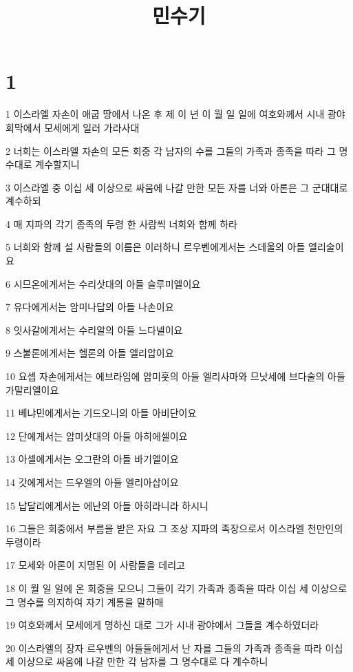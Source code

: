 

\title{민수기}


\chapter{1}

\par 1 이스라엘 자손이 애굽 땅에서 나온 후 제 이 년 이 월 일 일에 여호와께서 시내 광야 회막에서 모세에게 일러 가라사대
\par 2 너희는 이스라엘 자손의 모든 회중 각 남자의 수를 그들의 가족과 종족을 따라 그 명수대로 계수할지니
\par 3 이스라엘 중 이십 세 이상으로 싸움에 나갈 만한 모든 자를 너와 아론은 그 군대대로 계수하되
\par 4 매 지파의 각기 종족의 두령 한 사람씩 너희와 함께 하라
\par 5 너희와 함께 설 사람들의 이름은 이러하니 르우벤에게서는 스데울의 아들 엘리술이요
\par 6 시므온에게서는 수리삿대의 아들 슬루미엘이요
\par 7 유다에게서는 암미나답의 아들 나손이요
\par 8 잇사갈에게서는 수리알의 아들 느다넬이요
\par 9 스불론에게서는 헬론의 아들 엘리압이요
\par 10 요셉 자손에게서는 에브라임에 암미훗의 아들 엘리사마와 므낫세에 브다술의 아들 가말리엘이요
\par 11 베냐민에게서는 기드오니의 아들 아비단이요
\par 12 단에게서는 암미삿대의 아들 아히에셀이요
\par 13 아셀에게서는 오그란의 아들 바기엘이요
\par 14 갓에게서는 드우엘의 아들 엘리아삽이요
\par 15 납달리에게서는 에난의 아들 아히라니라 하시니
\par 16 그들은 회중에서 부름을 받은 자요 그 조상 지파의 족장으로서 이스라엘 천만인의 두령이라
\par 17 모세와 아론이 지명된 이 사람들을 데리고
\par 18 이 월 일 일에 온 회중을 모으니 그들이 각기 가족과 종족을 따라 이십 세 이상으로 그 명수를 의지하여 자기 계통을 말하매
\par 19 여호와께서 모세에게 명하신 대로 그가 시내 광야에서 그들을 계수하였더라
\par 20 이스라엘의 장자 르우벤의 아들들에게서 난 자를 그들의 가족과 종족을 따라 이십 세 이상으로 싸움에 나갈 만한 각 남자를 그 명수대로 다 계수하니
